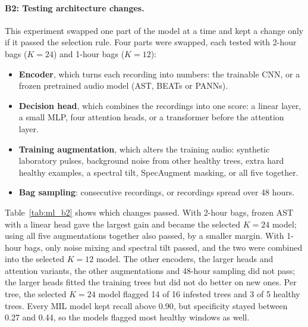 \paragraph{B2: Testing architecture changes.} This experiment swapped one part of the model at a time and kept a change only if it passed the selection rule. Four parts were swapped, each tested with 2-hour bags ($K=24$) and 1-hour bags ($K=12$):
\begin{itemize}
\item \textbf{Encoder}, which turns each recording into numbers: the trainable CNN, or a frozen pretrained audio model (AST, BEATs or PANNs).
\item \textbf{Decision head}, which combines the recordings into one score: a linear layer, a small MLP, four attention heads, or a transformer before the attention layer.
\item \textbf{Training augmentation}, which alters the training audio: synthetic laboratory pulses, background noise from other healthy trees, extra hard healthy examples, a spectral tilt, SpecAugment masking, or all five together.
\item \textbf{Bag sampling}: consecutive recordings, or recordings spread over 48 hours.
\end{itemize}
Table~\ref{tab:ml_b2} shows which changes passed. With 2-hour bags, frozen AST with a linear head gave the largest gain and became the selected $K=24$ model; using all five augmentations together also passed, by a smaller margin. With 1-hour bags, only noise mixing and spectral tilt passed, and the two were combined into the selected $K=12$ model. The other encoders, the larger heads and attention variants, the other augmentations and 48-hour sampling did not pass; the larger heads fitted the training trees but did not do better on new ones. Per tree, the selected $K=24$ model flagged 14 of 16 infested trees and 3 of 5 healthy trees. Every MIL model kept recall above 0.90, but specificity stayed between 0.27 and 0.44, so the models flagged most healthy windows as well.


